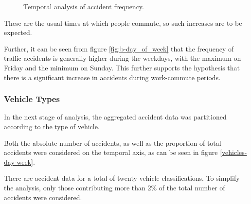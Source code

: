 \documentclass[12pt]{article}
\begin{document}
\begin{figure}[h]
\centering     %
{}
\caption{Temporal analysis of accident frequency.}
\end{figure}

These are the usual times at which people commute, so such increases are to be expected.

Further, it can be seen from figure \ref{fig:b-day_of_week} that the frequency of traffic accidents is generally higher during the weekdays, with the maximum on Friday and the minimum on Sunday. This further supports the hypothesis that there is a significant increase in accidents during work-commute periods.

\newpage

\subsubsection{Vehicle Types}

In the next stage of analysis, the aggregated accident data was partitioned according to the type of vehicle.

Both the absolute number of accidents, as well as the proportion of total accidents were considered on the temporal axis, as can be seen in figure \ref{vehicles-day-week}.

There are accident data for a total of twenty vehicle classifications. To simplify the analysis, only those contributing more than 2\% of the total number of accidents were considered.
\end{document}
